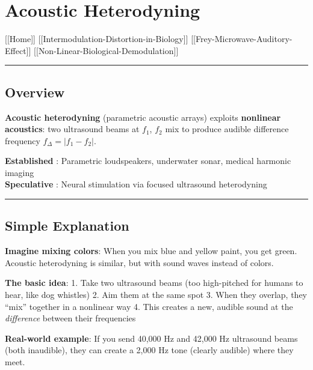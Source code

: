 \section{Acoustic Heterodyning}\label{acoustic-heterodyning}

{[}{[}Home{]}{]} \textbar{}
{[}{[}Intermodulation-Distortion-in-Biology{]}{]} \textbar{}
{[}{[}Frey-Microwave-Auditory-Effect{]}{]} \textbar{}
{[}{[}Non-Linear-Biological-Demodulation{]}{]}

\begin{center}\rule{0.5\linewidth}{0.5pt}\end{center}

\subsection{Overview}\label{overview}

\textbf{Acoustic heterodyning} (parametric acoustic arrays) exploits
\textbf{nonlinear acoustics}: two ultrasound beams at \(f_1\), \(f_2\)
mix to produce audible difference frequency \(f_\Delta = |f_1 - f_2|\).

\textbf{Established }: Parametric loudspeakers, underwater sonar,
medical harmonic imaging\\
\textbf{Speculative }: Neural stimulation via focused ultrasound
heterodyning

\begin{center}\rule{0.5\linewidth}{0.5pt}\end{center}

\subsection{\texorpdfstring{Simple Explanation
}{Simple Explanation }}\label{simple-explanation}

\textbf{Imagine mixing colors}: When you mix blue and yellow paint, you
get green. Acoustic heterodyning is similar, but with sound waves
instead of colors.

\textbf{The basic idea}: 1. Take two ultrasound beams (too high-pitched
for humans to hear, like dog whistles) 2. Aim them at the same spot 3.
When they overlap, they ``mix'' together in a nonlinear way 4. This
creates a new, audible sound at the \emph{difference} between their
frequencies

\textbf{Real-world example}: If you send 40,000 Hz and 42,000 Hz
ultrasound beams (both inaudible), they can create a 2,000 Hz tone
(clearly audible) where they meet.

